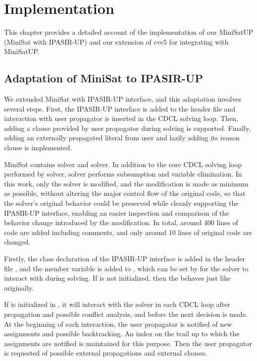 \chapter{Implementation}

This chapter provides a detailed account of the implementation of our MiniSatUP (MiniSat with IPASIR-UP) and our extension of cvc5 for integrating with MiniSatUP.

\section{Adaptation of MiniSat to IPASIR-UP}

We extended MiniSat with IPASIR-UP interface, and this adaptation involves several steps. First, the IPASIR-UP interface is added to the header file and interaction with user propagator is inserted in the CDCL solving loop. Then, adding a clause provided by user propagator during solving is supported. Finally, adding an externally propagated literal from user and lazily adding its reason clause is implemented.

MiniSat contains  solver and  solver. In addition to the core CDCL solving loop performed by  solver,  solver performs subsumption and variable elimination. In this work, only the  solver is modified, and the modification is made as minimum as possible, without altering the major control flow of the original code, so that the solver's original behavior could be preserved while cleanly supporting the IPASIR-UP interface, enabling an easier inspection and comparison of the behavior change introduced by the modification. In total, around 400 lines of code are added including comments, and only around 10 lines of original code are changed.

Firstly, the  class declaration of the IPASIR-UP interface is added in the header file , and the  member variable is added to , which can be set by  for the solver to interact with during solving. If  is not initialized, then the  behaves just like originally.

If  is initialized in , it will interact with the solver in each CDCL loop after propagation and possible conflict analysis, and before the next decision is made. At the beginning of each interaction, the user propagator is notified of new assignments and possible backtracking. An index on the trail up to which the assignments are notified is maintained for this purpose. Then the user propagator is requested of possible external propagations and external clauses.

